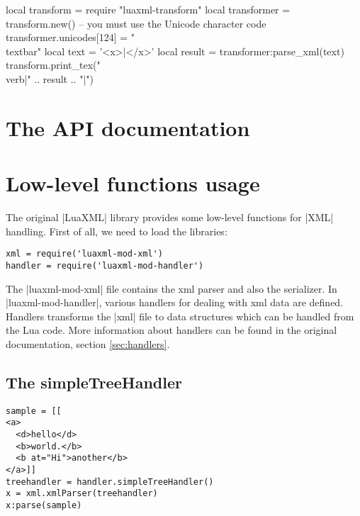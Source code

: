 \documentclass{ltxdoc}
\begin{document}
\begin{framed}
\begin{luacode*}
local transform = require "luaxml-transform"
local transformer = transform.new()
-- you must use the Unicode character code
transformer.unicodes[124] = "\\textbar"
local text = '<x>|</x>'
local result = transformer:parse_xml(text)
transform.print_tex("\\verb|" .. result .. "|")
\end{luacode*}
\end{framed}


\section{The API documentation}




\section{Low-level functions usage}



The original |LuaXML| library provides some low-level functions for |XML| handling.
First of all, we need to load the libraries:

\begin{verbatim}
xml = require('luaxml-mod-xml')
handler = require('luaxml-mod-handler')
\end{verbatim} 


The |luaxml-mod-xml| file contains the  xml parser and also the serializer. In
|luaxml-mod-handler|, various handlers for dealing with xml data are defined.
Handlers transforms the |xml| file to data structures which can be handled from
the Lua code. More information about handlers can be found in the original
documentation, section \ref{sec:handlers}.

\subsection{The simpleTreeHandler} 
\begin{verbatim}
sample = [[
<a>
  <d>hello</d>
  <b>world.</b>
  <b at="Hi">another</b>
</a>]]
treehandler = handler.simpleTreeHandler()
x = xml.xmlParser(treehandler)
x:parse(sample)
\end{verbatim} 
\end{document}
